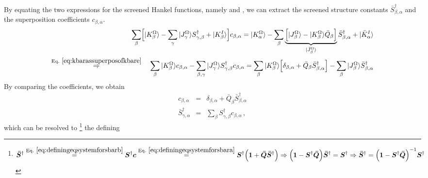 \documentclass[11pt,a4paper]{report}
\begin{document}
By equating the two expressions for the screened Hankel functions,
namely  and , we can
extract the screened structure constants
$\bar{S}^\dagger_{\beta,\alpha}$ and the superposition coefficients
$c_{\beta,\alpha}$.
\begin{eqnarray}
\sum_\beta\Bigl[|K^\Omega_{\beta}\rangle
-\sum_{\gamma}|J^\Omega_{\gamma}\rangle S^\dagger_{\gamma,\beta}
+|K^I_{\beta}\rangle \Bigr]c_{\beta,\alpha}
=
|K^\Omega_{\alpha}\rangle
-\sum_{\beta}
\underbrace{\Bigl[|J^\Omega_{\beta}\rangle-|K^\Omega_{\beta}\rangle\bar{Q}_\beta\Bigr]}
_{|\bar{J}^\Omega_{\beta}\rangle} \bar{S}^\dagger_{\beta,\alpha}
+|\bar{K}^I_{\alpha}\rangle
\nonumber\\
\eqrel{eq:kbarassuperposofkbare}{\Rightarrow}\quad
\sum_\beta
|K^\Omega_{\beta}\rangle c_{\beta,\alpha}
-\sum_{\beta,\gamma}|J^\Omega_{\gamma}\rangle S^\dagger_{\gamma,\beta} c_{\beta,\alpha}
=
\sum_{\beta}|K^\Omega_{\beta}\rangle
\Bigl[\delta_{\beta,\alpha}+
\bar{Q}_\beta \bar{S}^\dagger_{\beta,\alpha}\Bigr]
-\sum_{\beta}|J^\Omega_{\beta}\rangle \bar{S}^\dagger_{\beta,\alpha}
\nonumber\\
\end{eqnarray}
By comparing the coefficients, we obtain
\begin{eqnarray}
c_{\beta,\alpha}&=&\delta_{\beta,\alpha}+
\bar{Q}_\beta \bar{S}^\dagger_{\beta,\alpha}
\label{eq:definingeqsystemforsbara}
\\
\bar{S}^\dagger_{\gamma,\alpha}&=&\sum_\beta S^\dagger_{\gamma,\beta} c_{\beta,\alpha}
\,,
\label{eq:definingeqsystemforsbar}
\label{eq:definingeqsystemforsbarb}
\end{eqnarray}
which can be resolved to
\footnote{
\begin{eqnarray}
\mat{\bar{S}}^\dagger
\eqrel{eq:definingeqsystemforsbarb}{=}
\mat{S}^\dagger\mat{c}
\eqrel{eq:definingeqsystemforsbara}{=}
\mat{S}^\dagger\Bigl(\mat{1}+\mat{\bar{Q}}\mat{\bar{S}}^\dagger\Bigr)
\Rightarrow
\Bigl(\mat{1}-\mat{S}^\dagger\mat{\bar{Q}}\Bigr)\mat{\bar{S}}^\dagger
=\mat{S}^\dagger
\Rightarrow
\mat{\bar{S}}^\dagger
=\Bigl(\mat{1}-\mat{S}^\dagger\mat{\bar{Q}}\Bigr)^{-1}\mat{S}^\dagger
\end{eqnarray}
  } the defining
\end{document}
